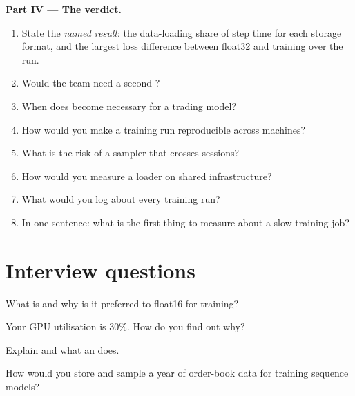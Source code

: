 \begin{problem}
\medskip\noindent\textbf{Part IV --- The verdict.}
\begin{enumerate}[resume]
\item State the \emph{named result}: the data-loading share of step time for each storage format, and the largest loss difference
between float32 and  training over the run.
\item Would the team need a second ?
\item When does  become necessary for a trading model?
\item How would you make a training run reproducible across machines?
\item What is the risk of a sampler that crosses sessions?
\item How would you measure a loader on shared infrastructure?
\item What would you log about every training run?
\item In one sentence: what is the first thing to measure about a slow training job?
\end{enumerate}
\end{problem}

\section{Interview questions}

\begin{interviewq}\label{iq:ml:training-infrastructure:1}
What is  and why is it preferred to float16 for training?
\end{interviewq}

\begin{interviewq}\label{iq:ml:training-infrastructure:2}
Your GPU utilisation is 30\%. How do you find out why?
\end{interviewq}

\begin{interviewq}\label{iq:ml:training-infrastructure:3}
Explain  and what an  does.
\end{interviewq}

\begin{interviewq}\label{iq:ml:training-infrastructure:4}
How would you store and sample a year of order-book data for training sequence models?
\end{interviewq}

